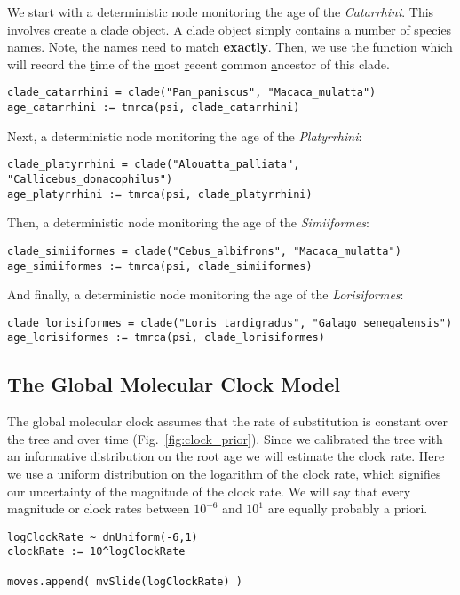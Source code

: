 We start with a deterministic node monitoring the age of the \emph{Catarrhini}.
This involves create a clade object.
A clade object simply contains a number of species names.
Note, the names need to match \textbf{exactly}.
Then, we use the  function which will record the \underline{t}ime of the \underline{m}ost \underline{r}ecent \underline{c}ommon \underline{a}ncestor of this clade.
{\tt \begin{snugshade*}
\begin{lstlisting}
clade_catarrhini = clade("Pan_paniscus", "Macaca_mulatta")
age_catarrhini := tmrca(psi, clade_catarrhini)
\end{lstlisting}
\end{snugshade*}}

Next, a deterministic node monitoring the age of the \emph{Platyrrhini}:
{\tt \begin{snugshade*}
\begin{lstlisting}
clade_platyrrhini = clade("Alouatta_palliata", "Callicebus_donacophilus")
age_platyrrhini := tmrca(psi, clade_platyrrhini)
\end{lstlisting}
\end{snugshade*}}

Then, a deterministic node monitoring the age of the \emph{Simiiformes}:
{\tt \begin{snugshade*}
\begin{lstlisting}
clade_simiiformes = clade("Cebus_albifrons", "Macaca_mulatta")
age_simiiformes := tmrca(psi, clade_simiiformes)
\end{lstlisting}
\end{snugshade*}}

And finally, a deterministic node monitoring the age of the \emph{Lorisiformes}:
{\tt \begin{snugshade*}
\begin{lstlisting}
clade_lorisiformes = clade("Loris_tardigradus", "Galago_senegalensis")
age_lorisiformes := tmrca(psi, clade_lorisiformes)
\end{lstlisting}
\end{snugshade*}}


\subsection{The Global Molecular Clock Model}

The global molecular clock assumes that the rate of substitution is constant over the tree and over time (Fig.~\ref{fig:clock_prior}).
Since we calibrated the tree with an informative distribution on the root age we will estimate the clock rate.
Here we use a uniform distribution on the logarithm of the clock rate, which signifies our uncertainty of the magnitude of the clock rate.
We will say that every magnitude or clock rates between $10^{-6}$ and $10^{1}$ are equally probably a priori.
{\tt \begin{snugshade*}
\begin{lstlisting}
logClockRate ~ dnUniform(-6,1)
clockRate := 10^logClockRate

moves.append( mvSlide(logClockRate) )
\end{lstlisting}
\end{snugshade*}}

